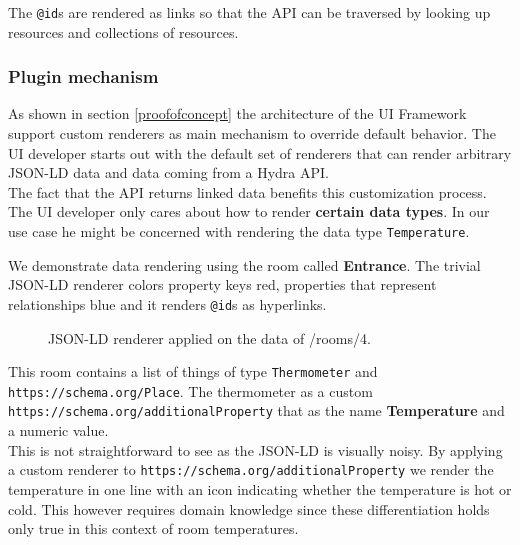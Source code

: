 The \lstinline{@id}s are rendered as links so that the API can be traversed by looking up resources and collections of resources.

\subsubsection{Plugin mechanism}\label{pluginmechanism}
As shown in section \ref{proofofconcept} the architecture of the UI Framework support custom renderers as main mechanism to override default behavior. The UI developer starts out with the default set of renderers that can render arbitrary JSON-LD data and data coming from a Hydra API. \\
The fact that the API returns linked data benefits this customization process. The UI developer only cares about how to render \textbf{certain data types}. In our use case he might be concerned with rendering the data type \lstinline{Temperature}.

We demonstrate data rendering using the room called \textbf{Entrance}. The trivial JSON-LD renderer colors property keys red, properties that represent relationships blue and it renders \lstinline{@id}s as hyperlinks.

\begin{figure}[!htb]
  \caption{JSON-LD renderer applied on the data of /rooms/4.}
\end{figure}

This room contains a list of things of type \lstinline{Thermometer} and \lstinline{https://schema.org/Place}. The thermometer as a custom \lstinline{https://schema.org/additionalProperty} that as the name \textbf{Temperature} and a numeric value. \\ This is not straightforward to see as the JSON-LD is visually noisy. By applying a custom renderer to \lstinline{https://schema.org/additionalProperty} we render the temperature in one line with an icon indicating whether the temperature is hot or cold. This however requires domain knowledge since these differentiation holds only true in this context of room temperatures.

